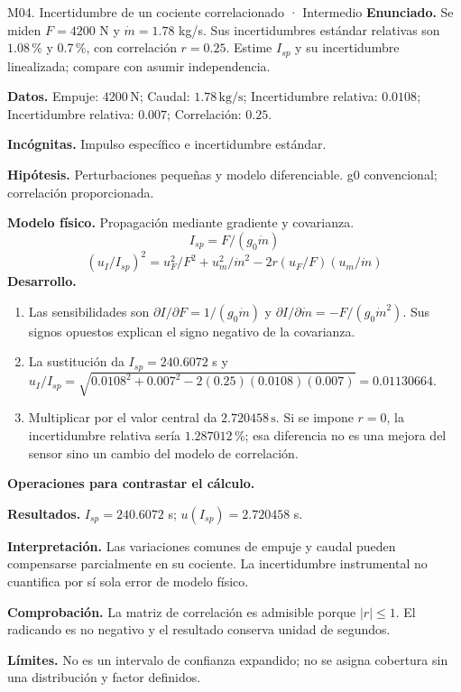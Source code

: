 \begin{studiumworked}{M04. Incertidumbre de un cociente correlacionado · Intermedio}
\textbf{Enunciado.} Se miden $F=4200$ N y $\dot m=1.78$ kg/s. Sus incertidumbres estándar relativas son $1.08$\,\% y 0.7\,\%, con correlación $r=0.25$. Estime $I_{sp}$ y su incertidumbre linealizada; compare con asumir independencia.

\textbf{Datos.} Empuje: $4200\,\mathrm{N}$; Caudal: $1.78\,\mathrm{kg/s}$; Incertidumbre relativa: $0.0108$; Incertidumbre relativa: $0.007$; Correlación: $0.25$.

\textbf{Incógnitas.} Impulso específico e incertidumbre estándar.

\textbf{Hipótesis.} Perturbaciones pequeñas y modelo diferenciable. g0 convencional; correlación proporcionada.

\textbf{Modelo físico.} Propagación mediante gradiente y covarianza.
\[I_{sp}=F/(g_0\dot m)\]
\[(u_I/I_{sp})^2=u_F^2/F^2+u_m^2/\dot m^2-2r(u_F/F)(u_m/\dot m)\]
\textbf{Desarrollo.}
\begin{enumerate}
\item Las sensibilidades son $\partial I/\partial F=1/(g_0\dot m)$ y $\partial I/\partial\dot m=-F/(g_0\dot m^2)$. Sus signos opuestos explican el signo negativo de la covarianza.
\item La sustitución da $I_{sp}=240.6072$ s y $u_I/I_{sp}=\sqrt{0.0108^2+0.007^2-2(0.25)(0.0108)(0.007)}=0.01130664$.
\item Multiplicar por el valor central da $2.720458\,\mathrm{s}$. Si se impone $r=0$, la incertidumbre relativa sería $1.287012$\,\%; esa diferencia no es una mejora del sensor sino un cambio del modelo de correlación.
\end{enumerate}
\textbf{Operaciones para contrastar el cálculo.}

\textbf{Resultados.} $I_{sp}=240.6072$ s; $u(I_{sp})=2.720458$ s.

\textbf{Interpretación.} Las variaciones comunes de empuje y caudal pueden compensarse parcialmente en su cociente. La incertidumbre instrumental no cuantifica por sí sola error de modelo físico.

\textbf{Comprobación.} La matriz de correlación es admisible porque $|r|\leq1$. El radicando es no negativo y el resultado conserva unidad de segundos.

\textbf{Límites.} No es un intervalo de confianza expandido; no se asigna cobertura sin una distribución y factor definidos.
\end{studiumworked}
